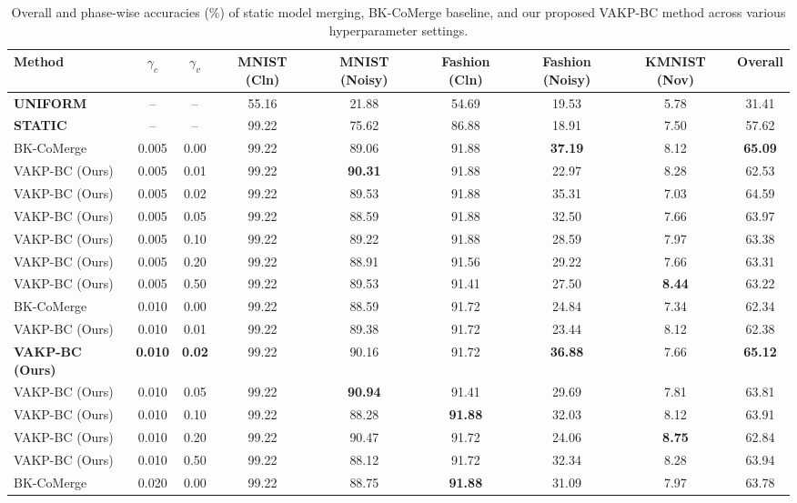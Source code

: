 \documentclass{article}
\theoremstyle{plain}
\theoremstyle{definition}
\theoremstyle{remark}
\begin{document}
\begin{table}[t]
\caption{Overall and phase-wise accuracies (\%) of static model merging, BK-CoMerge baseline, and our proposed VAKP-BC method across various hyperparameter settings.}
\label{tab:results}
\centering
\footnotesize
\setlength{\tabcolsep}{2.5pt}
\begin{tabular}{lcccccccc}
\toprule
Method & $\gamma_c$ & $\gamma_v$ & MNIST (Cln) & MNIST (Noisy) & Fashion (Cln) & Fashion (Noisy) & KMNIST (Nov) & Overall \\
\midrule
\textbf{UNIFORM} & -- & -- & 55.16 & 21.88 & 54.69 & 19.53 & 5.78 & 31.41 \\
\textbf{STATIC} & -- & -- & 99.22 & 75.62 & 86.88 & 18.91 & 7.50 & 57.62 \\
\midrule
BK-CoMerge & 0.005 & 0.00 & 99.22 & 89.06 & 91.88 & \textbf{37.19} & 8.12 & \textbf{65.09} \\
VAKP-BC (Ours) & 0.005 & 0.01 & 99.22 & \textbf{90.31} & 91.88 & 22.97 & 8.28 & 62.53 \\
VAKP-BC (Ours) & 0.005 & 0.02 & 99.22 & 89.53 & 91.88 & 35.31 & 7.03 & 64.59 \\
VAKP-BC (Ours) & 0.005 & 0.05 & 99.22 & 88.59 & 91.88 & 32.50 & 7.66 & 63.97 \\
VAKP-BC (Ours) & 0.005 & 0.10 & 99.22 & 89.22 & 91.88 & 28.59 & 7.97 & 63.38 \\
VAKP-BC (Ours) & 0.005 & 0.20 & 99.22 & 88.91 & 91.56 & 29.22 & 7.66 & 63.31 \\
VAKP-BC (Ours) & 0.005 & 0.50 & 99.22 & 89.53 & 91.41 & 27.50 & \textbf{8.44} & 63.22 \\
\midrule
BK-CoMerge & 0.010 & 0.00 & 99.22 & 88.59 & 91.72 & 24.84 & 7.34 & 62.34 \\
VAKP-BC (Ours) & 0.010 & 0.01 & 99.22 & 89.38 & 91.72 & 23.44 & 8.12 & 62.38 \\
\textbf{VAKP-BC (Ours)} & \textbf{0.010} & \textbf{0.02} & 99.22 & 90.16 & 91.72 & \textbf{36.88} & 7.66 & \textbf{65.12} \\
VAKP-BC (Ours) & 0.010 & 0.05 & 99.22 & \textbf{90.94} & 91.41 & 29.69 & 7.81 & 63.81 \\
VAKP-BC (Ours) & 0.010 & 0.10 & 99.22 & 88.28 & \textbf{91.88} & 32.03 & 8.12 & 63.91 \\
VAKP-BC (Ours) & 0.010 & 0.20 & 99.22 & 90.47 & 91.72 & 24.06 & \textbf{8.75} & 62.84 \\
VAKP-BC (Ours) & 0.010 & 0.50 & 99.22 & 88.12 & 91.72 & 32.34 & 8.28 & 63.94 \\
\midrule
BK-CoMerge & 0.020 & 0.00 & 99.22 & 88.75 & \textbf{91.88} & 31.09 & 7.97 & 63.78 \\

\end{tabular}
\end{table}
\end{document}
